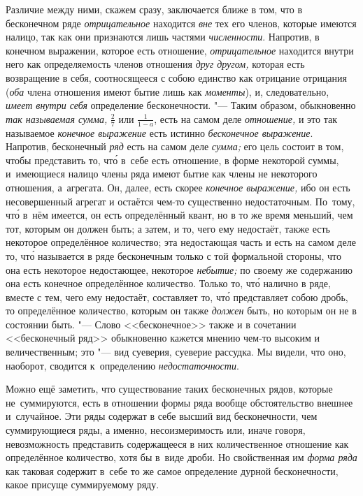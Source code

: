 Различие между ними, скажем сразу, заключается ближе в том, что в бесконечном
ряде {\em отрицательное} находится {\em вне} тех его членов, которые имеются
налицо, так как они признаются лишь частями {\em численности}. Напротив, в
конечном выражении, которое есть отношение, {\em отрицательное} находится
внутри него как определяемость членов отношения {\em друг другом,} которая есть
возвращение в себя, соотносящееся с собою единство как отрицание отрицания
({\em оба} члена отношения имеют бытие лишь как {\em моменты}), и,
следовательно, {\em имеет внутри себя} определение бесконечности. "--- Таким
образом, обыкновенно {\em так называемая сумма,} $\frac 2 7$ или
$\frac 1{1-a}$, есть на самом деле {\em отношение,} и это так называемое
{\em конечное выражение} есть истинно {\em бесконечное выражение}. Напротив,
бесконечный {\em ряд} есть на самом деле {\em сумма;} его цель состоит в том,
чтобы представить то, чт\'{о} в~себе есть отношение, в форме некоторой суммы,
и~имеющиеся налицо члены ряда имеют бытие как члены не некоторого отношения,
а~агрегата. Он, далее, есть скорее {\em конечное выражение,} ибо он есть
несовершенный агрегат и остаётся чем-то существенно недостаточным. По~тому,
чт\'{о} в~нём имеется, он есть определённый квант, но в то же время
меньший, чем тот, которым он должен быть; а затем,
и то, чего ему недостаёт, также есть некоторое определённое количество; эта
недостающая часть и есть на самом деле то, чт\'{о} называется в ряде
бесконечным только с той формальной стороны, что она есть некоторое
недостающее, некоторое {\em небытие;} по своему же содержанию она есть конечное
определённое количество. Только то, чт\'{о} налично в ряде, вместе с тем, чего
ему недостаёт, составляет то, чт\'{о} представляет собою дробь, то определённое
количество, которым он также {\em должен} быть, но которым он не в состоянии
быть. "--- Слово <<бесконечное>> также и в сочетании <<бесконечный ряд>>
обыкновенно кажется мнению чем-то высоким и величественным; это "--- вид
суеверия, суеверие рассудка. Мы видели, что оно, наоборот, сводится
к~определению {\em недостаточности}.

Можно ещё заметить, что существование таких бесконечных рядов, которые
не~суммируются, есть в отношении формы ряда вообще обстоятельство внешнее
и~случайное. Эти ряды содержат в себе высший вид бесконечности, чем
суммирующиеся ряды, а именно, несоизмеримость или, иначе говоря, невозможность
представить содержащееся в них количественное отношение как
определённое количество, хотя бы в~виде дроби. Но свойственная им
{\em форма ряда} как таковая содержит в~себе то же самое определение дурной
бесконечности, какое присуще суммируемому ряду.

